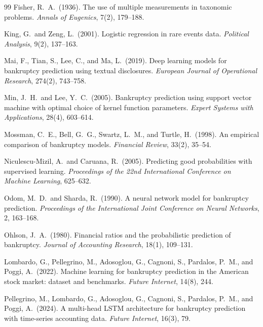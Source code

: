 \documentclass[11pt,a4paper]{article}
\begin{document}
\begin{thebibliography}{99}
Fisher, R.\ A.\ (1936).
\newblock The use of multiple measurements in taxonomic problems.
\newblock \textit{Annals of Eugenics}, 7(2), 179--188.

King, G.\ and Zeng, L.\ (2001).
\newblock Logistic regression in rare events data.
\newblock \textit{Political Analysis}, 9(2), 137--163.

Mai, F., Tian, S., Lee, C., and Ma, L.\ (2019).
\newblock Deep learning models for bankruptcy prediction using textual
disclosures.
\newblock \textit{European Journal of Operational Research}, 274(2),
743--758.

Min, J.\ H.\ and Lee, Y.\ C.\ (2005).
\newblock Bankruptcy prediction using support vector machine with optimal
choice of kernel function parameters.
\newblock \textit{Expert Systems with Applications}, 28(4), 603--614.

Mossman, C.\ E., Bell, G.\ G., Swartz, L.\ M., and Turtle, H.\ (1998).
\newblock An empirical comparison of bankruptcy models.
\newblock \textit{Financial Review}, 33(2), 35--54.

Niculescu-Mizil, A.\ and Caruana, R.\ (2005).
\newblock Predicting good probabilities with supervised learning.
\newblock \textit{Proceedings of the 22nd International Conference on Machine
Learning}, 625--632.

Odom, M.\ D.\ and Sharda, R.\ (1990).
\newblock A neural network model for bankruptcy prediction.
\newblock \textit{Proceedings of the International Joint Conference on Neural
Networks}, 2, 163--168.

Ohlson, J.\ A.\ (1980).
\newblock Financial ratios and the probabilistic prediction of bankruptcy.
\newblock \textit{Journal of Accounting Research}, 18(1), 109--131.

Lombardo, G., Pellegrino, M., Adosoglou, G., Cagnoni, S., Pardalos, P.\ M.,
and Poggi, A.\ (2022).
\newblock Machine learning for bankruptcy prediction in the American stock
market: dataset and benchmarks.
\newblock \textit{Future Internet}, 14(8), 244.

Pellegrino, M., Lombardo, G., Adosoglou, G., Cagnoni, S., Pardalos, P.\ M.,
and Poggi, A.\ (2024).
\newblock A multi-head LSTM architecture for bankruptcy prediction with
time-series accounting data.
\newblock \textit{Future Internet}, 16(3), 79.


\end{thebibliography}
\end{document}
